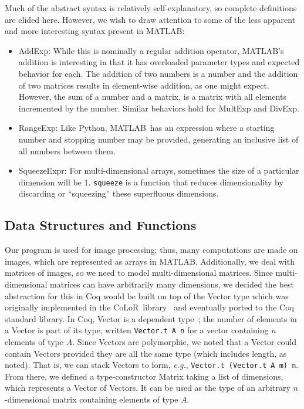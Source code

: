 \documentclass[11pt,conference]{IEEEtran}
\newcommand{\matlab}{MATLAB}
\newcommand{\mmatlab}{\textmu\matlab}
\newcommand{\colorlib}{CoLoR}
\theoremstyle{plain} %
\theoremstyle{definition}
\theoremstyle{remark}
\begin{document}
Much of the abstract syntax is relatively self-explanatory, so complete
definitions are elided here. However, we wish to draw attention to some of the
less apparent and more interesting syntax present in \mmatlab\@:

\begin{itemize}

    \item \textsf{AddExp}: While this is nominally a regular addition operator,
        \matlab's addition is interesting in that it has overloaded parameter
        types and expected behavior for each. The addition of two numbers is a
        number and the addition of two matrices results in element-wise
        addition, as one might expect. However, the sum of a number and a
        matrix, is a matrix with all elements incremented by the number. Similar
        behaviors hold for \textsf{MultExp} and \textsf{DivExp}.

    \item \textsf{RangeExp}: Like Python, \matlab\ has an expression where a
        starting number and stopping number may be provided, generating an
        inclusive list of all numbers between them.

    \item \textsf{SqueezeExpr}: For multi-dimensional arrays, sometimes the size
        of a particular dimension will be 1. \texttt{squeeze} is a function that
        reduces dimensionality by discarding or ``squeezing'' these superfluous
        dimensions.

\end{itemize}

\subsection{Data Structures and Functions}

Our program is used for image processing; thus, many computations are made on
images, which are represented as arrays in \matlab\@. Additionally, we deal with
matrices of images, so we need to model multi-dimensional matrices. Since
multi-dimensional matrices can have arbitrarily many dimensions, we decided the
best abstraction for this in Coq would be built on top of the \textsf{Vector}
type which was originally implemented in the \colorlib\
library~\cite{BLANQUI_2011} and eventually ported to the Coq standard library.
In Coq, \textsf{Vector} is a dependent type~\cite{Bove2009,Thorsten_2010}; the
number of elements in a \textsf{Vector} is part of its type, written
\texttt{Vector.t A n} for a vector containing \(n\) elements of type \(A\).
Since \textsf{Vector}s are polymorphic, we noted that a \textsf{Vector} could
contain \textsf{Vector}s provided they are all the same type (which includes
length, as noted). That is, we can stack \textsf{Vector}s to form, \emph{e.g.},
\texttt{Vector.t (Vector.t A m) n}. From there, we defined a type-constructor
\textsf{Matrix} taking a list of dimensions, which represents a \textsf{Vector}
of \textsf{Vector}s. It can be used as the type of an arbitrary
\(n\)-dimensional matrix containing elements of type \(A\).
\end{document}
